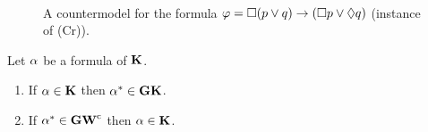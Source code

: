 \begin{figure}[t]
\[\begin{array}{c}
  \end{array}
  \]
  
  \caption{A countermodel for the formula $\varphi=\Box (p\lor q)\to
    (\Box p \lor \lozenge q) $ (instance of (Cr)).}
  \label{fig:countGW}
\end{figure}



\begin{lemma}\label{lemma:K}
  Let $\alpha$ be a formula of  $\mathbf{K}$. 

\begin{enumerate}[label=(\roman*), ref=(\roman*),leftmargin=*]    
\item\label{lemma:K:1}
If $\alpha\in\mathbf{K}$ then $\alpha^*\in \mathbf{GK}$.
  
\item\label{lemma:K:2}
If $\alpha^*\in \mathbf{GW}^\mathrm{c}$ then  $\alpha\in\mathbf{K}$. 
  
  \end{enumerate}
\end{lemma}

